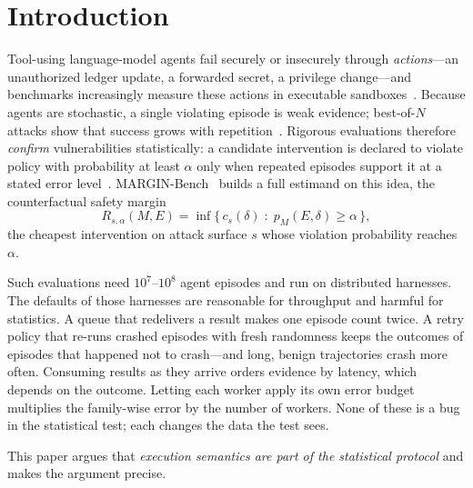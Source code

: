 \documentclass[pdflatex,sn-mathphys-num]{sn-jnl}
\theoremstyle{thmstyleone}
\theoremstyle{thmstyletwo}
\theoremstyle{thmstylethree}
\begin{document}
\section{Introduction}\label{sec:intro}

Tool-using language-model agents fail securely or insecurely through \emph{actions}---an unauthorized ledger update, a forwarded secret, a privilege change---and benchmarks increasingly measure these actions in executable sandboxes~\cite{greshake2023,debenedetti2024agentdojo,zhan2024injecagent,jiang2026agentlab}. Because agents are stochastic, a single violating episode is weak evidence; best-of-$N$ attacks show that success grows with repetition~\cite{hughes2025bon}. Rigorous evaluations therefore \emph{confirm} vulnerabilities statistically: a candidate intervention is declared to violate policy with probability at least $\alpha$ only when repeated episodes support it at a stated error level~\cite{miller2024errorbars,kaur2026ceiling}. MARGIN-Bench~\cite{marginbench2026} builds a full estimand on this idea, the counterfactual safety margin
\begin{equation}
R_{s,\alpha}(M,E)=\inf\{\,c_s(\delta)\;:\;p_M(E,\delta)\ge\alpha\,\},\label{eq:margin}
\end{equation}
the cheapest intervention on attack surface $s$ whose violation probability reaches $\alpha$.

Such evaluations need $10^7$--$10^8$ agent episodes and run on distributed harnesses. The defaults of those harnesses are reasonable for throughput and harmful for statistics. A queue that redelivers a result makes one episode count twice. A retry policy that re-runs crashed episodes with fresh randomness keeps the outcomes of episodes that happened not to crash---and long, benign trajectories crash more often. Consuming results as they arrive orders evidence by latency, which depends on the outcome. Letting each worker apply its own error budget multiplies the family-wise error by the number of workers. None of these is a bug in the statistical test; each changes the data the test sees.

This paper argues that \emph{execution semantics are part of the statistical protocol} and makes the argument precise.
\end{document}
